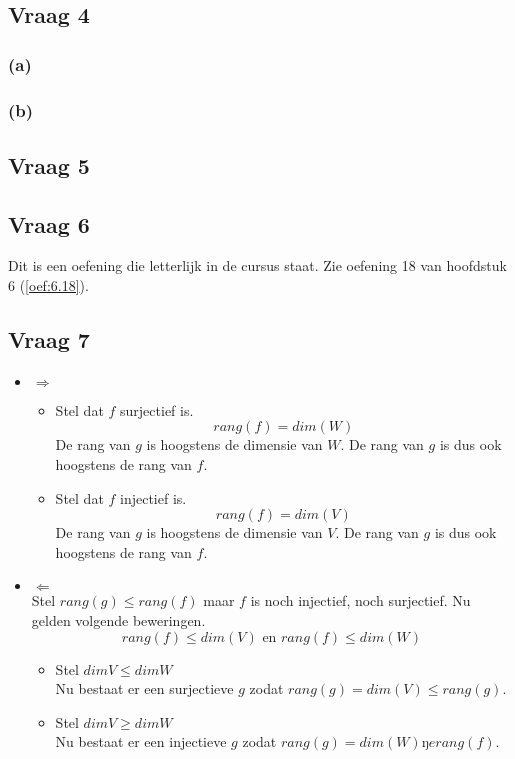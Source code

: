 \documentclass[lineaire_algebra_oplossingen.tex]{subfiles}
\begin{document}
\subsection{Vraag 4}
\subsubsection*{(a)}
\subsubsection*{(b)}

\subsection{Vraag 5}

\subsection{Vraag 6}
Dit is een oefening die letterlijk in de cursus staat. Zie oefening 18 van hoofdstuk 6 (\ref{oef:6.18}).


\subsection{Vraag 7}
\begin{itemize}
\item $\Rightarrow$\\
\begin{itemize}
\item Stel dat $f$ surjectief is.\\
\[
rang(f) = dim(W)
\]
De rang van $g$ is hoogstens de dimensie van $W$. De rang van $g$ is dus ook hoogstens de rang van $f$. 
\item Stel dat $f$ injectief is.\\
\[
rang(f) = dim(V)
\]
De rang van $g$ is hoogstens de dimensie van $V$. De rang van $g$ is dus ook hoogstens de rang van $f$. 
\end{itemize}
\item $\Leftarrow$\\
Stel $rang(g) \le rang(f)$ maar $f$ is noch injectief, noch surjectief.
Nu gelden volgende beweringen.
\[
rang(f) \le dim(V) \text{ en } rang(f) \le dim(W)
\]
\begin{itemize}
\item Stel $dim V \le dim W$\\
Nu bestaat er een surjectieve $g$ zodat $rang(g) = dim(V) \le rang (g)$.
\item Stel $dim V \ge dim W$\\
Nu bestaat er een injectieve $g$ zodat $rang(g) = dim(W) ŋe rang(f)$.
\end{itemize}
\end{itemize}
\end{document}
